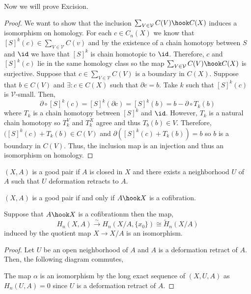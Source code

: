 \documentclass[12pt]{extarticle}
\begin{document}
Now we will prove Excision.
\begin{proof}
We want to show that the inclusion $\sum_{V \in \mathcal{V}} C(V) \hook C(X)$ induces a isomorphism on homology. For each $c \in C_n(X)$ we know that $[S]^k(c) \in \sum_{V \in \mathcal{V}} C(v)$ and by the existence of a chain homotopy between $S$ and $\id$ we have that $[S]^k$ is chain homotopic to $\id$. Therefore, $c$ and $[S]^k(c)$ lie in the same homology class so the map $\sum_{V \in \mathcal{V}} C(V) \hook C(X)$ is surjective. Suppose that $c \in \sum_{V \in \mathcal{V}} C(V)$ is a boundary in $C(X)$. Suppose that $b \in C(V)$ and $\exists : c \in C(X)$ such that $\partial c = b$. Take $k$ such that $[S]^k(c)$ is $\mathcal{V}$-small. Then,
\[ \partial \circ [S]^k(c) = [S]^k(\partial c) = [S]^k(b) = b - \partial \circ T_k(b) \]
where $T_k$ is a chain homotopy between $[S]^k$ and $\id$. However, $T_k$ is a natural chain homotopy so $T_k^V$ and $T_k^X$ agree and thus $T_b(b) \in V$. Therefore, $([S]^k(c) + T_k(b) \in C(V)$ and $\partial ([S]^k(c) + T_k(b)) = b$ so $b$ is a boundary in $C(V)$. Thus, the inclusion map is an injection and thus an isomorphism on homology. 
\end{proof}

\begin{definition}
$(X,A)$ is a good pair if $A$ is closed in $X$ and there exists a neighborhood $U$ of $A$ such that $U$ deformation retracts to $A$.
\end{definition}

\begin{lemma}
$(X, A)$ is a good pair if and only if $A \hook X$ is a cofibration.
\end{lemma}

\begin{corollary}
Suppose that $A \hook X$ is a cofibrationm then the map,
\[ H_n(X, A) \xrightarrow{\sim} H_n(X/A, \{x_0\}) \cong \tilde{H}_n(X/A) \]
induced by the quotient map $X \to X/A$ is an isomorphism.
\end{corollary}

\begin{proof}
Let $U$ be an open neighborhood of $A$ and $A$ is a deformation retract of $A$.
Then, the following diagram commutes,
\begin{center}
\end{center}
The map $\alpha$ is an isomorphism by the long exact sequence of $(X, U, A)$ as $H_n(U, A) = 0$ since $U$ is a deformation retract of $A$. 
\end{proof}
\end{document}
